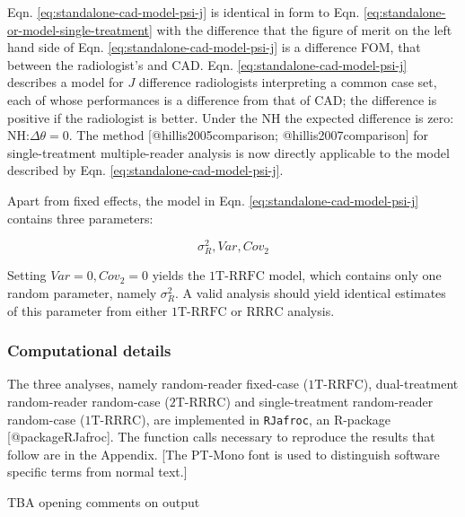\documentclass[
]{article}
\begin{document}
Eqn. \eqref{eq:standalone-cad-model-psi-j} is identical in form to Eqn. \eqref{eq:standalone-or-model-single-treatment} with the difference that the figure of merit on the left hand side of Eqn. \eqref{eq:standalone-cad-model-psi-j} is a difference FOM, that between the radiologist's and CAD. Eqn. \eqref{eq:standalone-cad-model-psi-j} describes a model for \(J\) difference radiologists interpreting a common case set, each of whose performances is a difference from that of CAD; the difference is positive if the radiologist is better. Under the NH the expected difference is zero: \(\text{NH:} \Delta \theta = 0\). The method {[}@hillis2005comparison; @hillis2007comparison{]} for single-treatment multiple-reader analysis is now directly applicable to the model described by Eqn. \eqref{eq:standalone-cad-model-psi-j}.

Apart from fixed effects, the model in Eqn. \eqref{eq:standalone-cad-model-psi-j} contains three parameters:

\begin{equation}
\sigma_R^2, Var, Cov_2
\label{eq:standalone-cad-parameter-simplified-model}
\end{equation}

Setting \(Var = 0, Cov_2 = 0\) yields the \(\text{1T-RRFC}\) model, which contains only one random parameter, namely \(\sigma_R^2\). A valid analysis should yield identical estimates of this parameter from either \(\text{1T-RRFC}\) or \(\text{RRRC}\) analysis.

\hypertarget{standalone-cad-radiologists-computational-details}{%
\subsubsection{Computational details}\label{standalone-cad-radiologists-computational-details}}

The three analyses, namely random-reader fixed-case (\(\text{1T-RRFC}\)), dual-treatment random-reader random-case (\(\text{2T-RRRC}\)) and single-treatment random-reader random-case (\(\text{1T-RRRC}\)), are implemented in \texttt{RJafroc}, an R-package {[}@packageRJafroc{]}. The function calls necessary to reproduce the results that follow are in the Appendix. {[}The PT-Mono font is used to distinguish software specific terms from normal text.{]}

TBA opening comments on output
\end{document}
